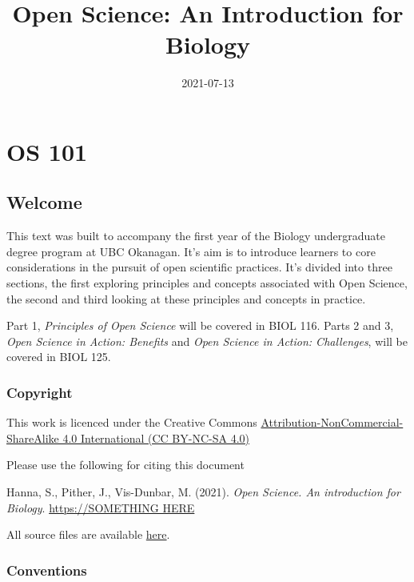 \documentclass[
]{book}
\title{Open Science: An Introduction for Biology}
\author{}
\date{\vspace{-2.5em}2021-07-13}
\begin{document}
\maketitle

{
\setcounter{tocdepth}{1}
\tableofcontents
}
\hypertarget{part-os-101}{%
\part*{OS 101}\label{part-os-101}}

\hypertarget{welcome}{%
\chapter*{Welcome}\label{welcome}}

This text was built to accompany the first year of the Biology undergraduate degree program at UBC Okanagan. It's aim is to introduce learners to core considerations in the pursuit of open scientific practices. It's divided into three sections, the first exploring principles and concepts associated with Open Science, the second and third looking at these principles and concepts in practice.

Part 1, \emph{Principles of Open Science} will be covered in BIOL 116. Parts 2 and 3, \emph{Open Science in Action: Benefits} and \emph{Open Science in Action: Challenges}, will be covered in BIOL 125.

\hypertarget{copyright}{%
\section*{Copyright}\label{copyright}}

This work is licenced under the Creative Commons \href{https://creativecommons.org/licenses/by-nc-sa/4.0/}{Attribution-NonCommercial-ShareAlike 4.0 International (CC BY-NC-SA 4.0)}

Please use the following for citing this document

Hanna, S., Pither, J., Vis-Dunbar, M. (2021). \emph{Open Science. An introduction for Biology}. \href{}{https://SOMETHING HERE}

All source files are available \href{}{here}.

\hypertarget{conventions}{%
\section*{Conventions}\label{conventions}}
\end{document}
